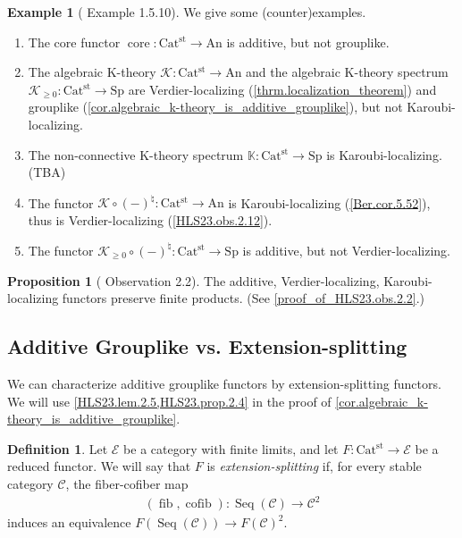 \documentclass[a4paper,dvipdfmx,11pt,reqno]{amsart}
\DeclareMathOperator{\fib}{fib}
\DeclareMathOperator{\cofib}{cofib}
\newcommand{\C}{\mathcal{C}}
\newcommand{\E}{\mathcal{E}}
\newcommand{\K}{\mathcal{K}}
\DeclareMathOperator{\Seq}{Seq}
\DeclareMathOperator{\core}{core}
\newcommand{\An}{\mathrm{An}}
\newcommand{\Catst}{\mathrm{Cat^{st}}}
\newcommand{\Sp}{\mathrm{Sp}}
\newcommand{\bbK}{\mathbb{K}}
\theoremstyle{definition}
\newtheorem{definition}[theorem]{Definition}
\newtheorem{example}[theorem]{Example}
\newtheorem{proposition}[theorem]{Proposition}
\begin{document}
\begin{example}[\cite{CDH23} Example 1.5.10] \label{CDH23.eg.1.5.10}
  We give some (counter)examples.
  \begin{enumerate}
    \item The core functor $\core : \Catst \to \An$ is additive, but not grouplike. %
    \item The algebraic K-theory $\K : \Catst \to \An$ and the algebraic K-theory spectrum $\K_{\geq 0} : \Catst \to \Sp$ are Verdier-localizing (\cref{thrm.localization_theorem}) and grouplike (\cref{cor.algebraic_k-theory_is_additive_grouplike}), but not Karoubi-localizing.
    \item The non-connective K-theory spectrum $\bbK : \Catst \to \Sp$ is Karoubi-localizing. (TBA)
    \item The functor $\K \circ (-)^{\natural} : \Catst \to \An$ is Karoubi-localizing (\cref{Ber.cor.5.52}), thus is Verdier-localizing (\cref{HLS23.obs.2.12}).
    \item The functor $\K_{\geq 0} \circ (-)^{\natural} : \Catst \to \Sp$ is additive, but not Verdier-localizing.
  \end{enumerate}
\end{example}

\begin{proposition}[\cite{HLS23} Observation 2.2] \label{HLS23.obs.2.2} %
  The additive, Verdier-localizing, Karoubi-localizing functors preserve finite products.
  (See \cref{proof_of_HLS23.obs.2.2}.)
\end{proposition}

\subsection{Additive Grouplike vs. Extension-splitting}

We can characterize additive grouplike functors by extension-splitting functors.
We will use \cref{HLS23.lem.2.5,HLS23.prop.2.4} in the proof of \cref{cor.algebraic_k-theory_is_additive_grouplike}.

\begin{definition}
  Let $\E$ be a category with finite limits, and let $F : \Catst \to \E$ be a reduced functor.
  We will say that $F$ is \textit{extension-splitting} if, for every stable category $\C$, the fiber-cofiber map
  \begin{align*}
    (\fib,\cofib) : \Seq(\C) \to \C^2
  \end{align*}
  induces an equivalence $F(\Seq(\C)) \to F(\C)^2$.
\end{definition}
\end{document}
